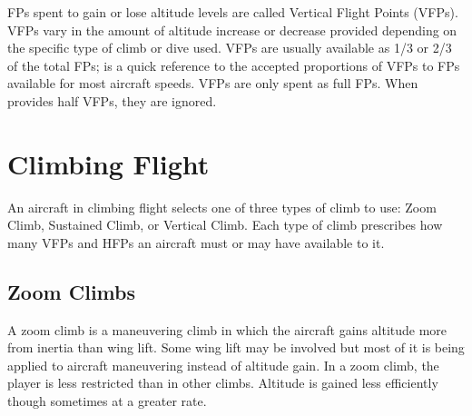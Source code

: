 FPs spent to gain or lose altitude levels are called Vertical Flight Points (VFPs). VFPs vary in the amount of altitude increase or decrease provided depending on the specific type of climb or dive used. VFPs are usually available as 1/3 or 2/3 of the total FPs;  is a quick reference to the accepted proportions of VFPs to FPs available for most aircraft speeds. VFPs are only spent as full FPs. When  provides half VFPs, they are ignored. 


\section{Climbing Flight}
\label{rule:climbing-flight}

An aircraft in climbing flight selects one of three types of climb to use: Zoom Climb, Sustained Climb, or Vertical Climb. Each type of climb prescribes how many VFPs and HFPs an aircraft must or may have available to it.

\subsection{Zoom Climbs}
\label{rule:zoom-climbs}

A zoom climb is a maneuvering climb in which the aircraft gains altitude more from inertia than wing lift. Some wing lift may be involved but most of it is being applied to aircraft maneuvering instead of altitude gain. In a zoom climb, the player is less restricted than in other climbs. Altitude is gained less efficiently though sometimes at a greater rate.


